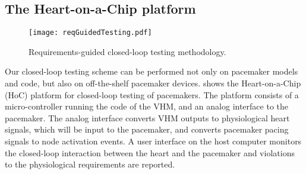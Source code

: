 \subsection{The Heart-on-a-Chip platform}
\label{HoC}

\begin{figure}[!t]
	\centering
	\texttt{[image: reqGuidedTesting.pdf]}
	\caption{\small Requirements-guided closed-loop testing methodology.}
	\label{fig:reqGuidedTesting}
\end{figure} 
Our closed-loop testing scheme can be performed not only on pacemaker models and code, but also on off-the-shelf pacemaker devices. 
 shows the Heart-on-a-Chip (HoC) platform for closed-loop testing of pacemakers. 
The platform consists of a micro-controller running the code of the VHM, and an analog interface to the pacemaker. 
The analog interface converts VHM outputs to physiological heart signals, which will be input to the pacemaker, and converts pacemaker pacing signals to node activation events.  
A user interface on the host computer monitors the closed-loop interaction between the heart and the pacemaker and violations to the physiological requirements are reported.
